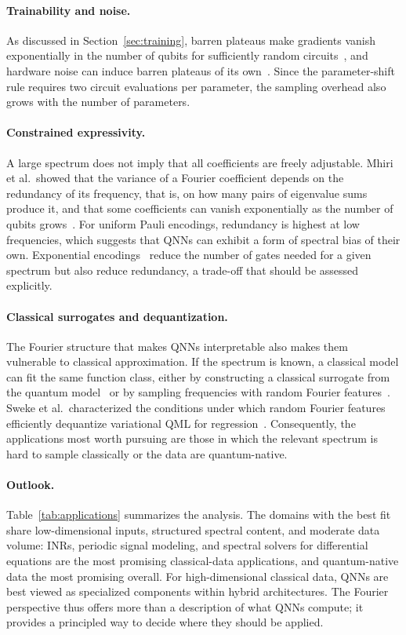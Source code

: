 \documentclass[12pt]{article}
\numberwithin{equation}{section}  %
\begin{document}
\paragraph{Trainability and noise.} As discussed in Section~\ref{sec:training}, barren plateaus make gradients vanish exponentially in the number of qubits for sufficiently random circuits~\cite{mcclean2018barren}, and hardware noise can induce barren plateaus of its own~\cite{wang2021noise}. Since the parameter-shift rule requires two circuit evaluations per parameter, the sampling overhead also grows with the number of parameters.

\paragraph{Constrained expressivity.} A large spectrum does not imply that all coefficients are freely adjustable. Mhiri et al.\ showed that the variance of a Fourier coefficient depends on the redundancy of its frequency, that is, on how many pairs of eigenvalue sums produce it, and that some coefficients can vanish exponentially as the number of qubits grows~\cite{mhiri2025constrained}. For uniform Pauli encodings, redundancy is highest at low frequencies, which suggests that QNNs can exhibit a form of spectral bias of their own. Exponential encodings~\cite{shin2023exponential, kordzanganeh2023exponentially} reduce the number of gates needed for a given spectrum but also reduce redundancy, a trade-off that should be assessed explicitly.

\paragraph{Classical surrogates and dequantization.} The Fourier structure that makes QNNs interpretable also makes them vulnerable to classical approximation. If the spectrum is known, a classical model can fit the same function class, either by constructing a classical surrogate from the quantum model~\cite{schreiber2023classical} or by sampling frequencies with random Fourier features~\cite{landman2023classically}. Sweke et al.\ characterized the conditions under which random Fourier features efficiently dequantize variational QML for regression~\cite{sweke2025potential}. Consequently, the applications most worth pursuing are those in which the relevant spectrum is hard to sample classically or the data are quantum-native.

\paragraph{Outlook.} Table~\ref{tab:applications} summarizes the analysis. The domains with the best fit share low-dimensional inputs, structured spectral content, and moderate data volume: INRs, periodic signal modeling, and spectral solvers for differential equations are the most promising classical-data applications, and quantum-native data the most promising overall. For high-dimensional classical data, QNNs are best viewed as specialized components within hybrid architectures. The Fourier perspective thus offers more than a description of what QNNs compute; it provides a principled way to decide where they should be applied.
\end{document}
